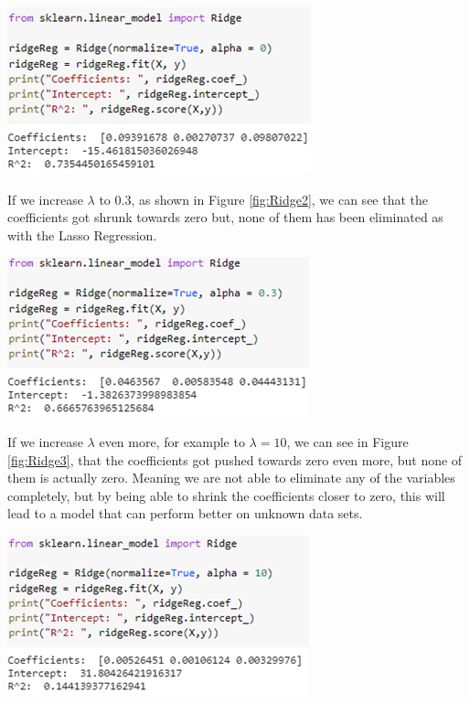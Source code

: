 \documentclass[a4paper,12pt]{report}
\begin{document}
\begin{center}
    \captionsetup{type=figure}
    \includegraphics[width=.7\linewidth]{media/Ridge1.png}
    \label{fig:Ridge1}
\end{center}

If we increase $\lambda$ to 0.3, as shown in Figure \ref{fig:Ridge2}, we can see that the coefficients got shrunk towards zero but, none of them has been eliminated as with the Lasso Regression. 

\begin{center}
    \captionsetup{type=figure}
    \includegraphics[width=.7\linewidth]{media/Ridge2.png}
    \label{fig:Ridge2}
\end{center}

If we increase $\lambda$ even more, for example to $\lambda=10$, we can see in Figure \ref{fig:Ridge3}, that the coefficients got pushed towards zero even more, but none of them is actually zero. Meaning we are not able to eliminate any of the variables completely, but by being able to shrink the coefficients closer to zero, this will lead to a model that can perform better on unknown data sets. 

\begin{center}
    \captionsetup{type=figure}
    \includegraphics[width=.7\linewidth]{media/Ridge3.png}
    \label{fig:Ridge3}
\end{center}
\end{document}
